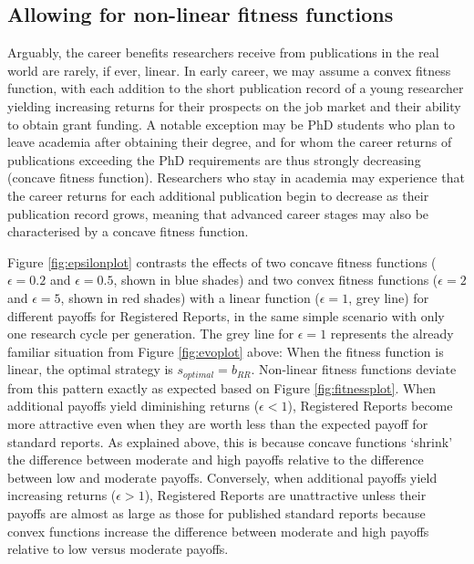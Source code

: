 \documentclass[
  ,man,mask,floatsintext]{apa6}
\begin{document}
\hypertarget{allowing-for-non-linear-fitness-functions}{%
\subsection{Allowing for non-linear fitness functions}\label{allowing-for-non-linear-fitness-functions}}

Arguably, the career benefits researchers receive from publications in the real world are rarely, if ever, linear.
In early career, we may assume a convex fitness function, with each addition to the short publication record of a young researcher yielding increasing returns for their prospects on the job market and their ability to obtain grant funding.
A notable exception may be PhD students who plan to leave academia after obtaining their degree, and for whom the career returns of publications exceeding the PhD requirements are thus strongly decreasing (concave fitness function).
Researchers who stay in academia may experience that the career returns for each additional publication begin to decrease as their publication record grows, meaning that advanced career stages may also be characterised by a concave fitness function.

Figure \ref{fig:epsilonplot} contrasts the effects of two concave fitness functions (\(\epsilon = 0.2\) and \(\epsilon = 0.5\), shown in blue shades) and two convex fitness functions (\(\epsilon = 2\) and \(\epsilon = 5\), shown in red shades) with a linear function (\(\epsilon = 1\), grey line) for different payoffs for Registered Reports, in the same simple scenario with only one research cycle per generation.
The grey line for \(\epsilon = 1\) represents the already familiar situation from Figure \ref{fig:evoplot} above:
When the fitness function is linear, the optimal strategy is \(s_{optimal} = b_{RR}\).
Non-linear fitness functions deviate from this pattern exactly as expected based on Figure \ref{fig:fitnessplot}.
When additional payoffs yield diminishing returns (\(\epsilon <1\)), Registered Reports become more attractive even when they are worth less than the expected payoff for standard reports.
As explained above, this is because concave functions `shrink' the difference between moderate and high payoffs relative to the difference between low and moderate payoffs.
Conversely, when additional payoffs yield increasing returns (\(\epsilon > 1\)), Registered Reports are unattractive unless their payoffs are almost as large as those for published standard reports because convex functions increase the difference between moderate and high payoffs relative to low versus moderate payoffs.
\end{document}
